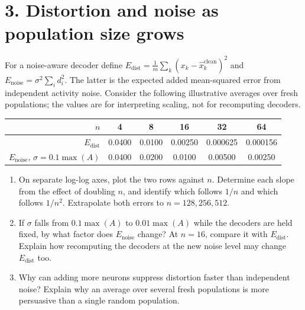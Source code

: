 \documentclass[11pt,letterpaper]{article}
\begin{document}
\section*{3. Distortion and noise as population size grows}
For a noise-aware decoder define \(E_{\mathrm{dist}}=\frac1m\sum_k(x_k-\hat{x}_k^{\mathrm{clean}})^2\) and \(E_{\mathrm{noise}}=\sigma^2\sum_i d_i^2\). The latter is the expected added mean-squared error from independent activity noise. Consider the following illustrative averages over fresh populations; the values are for interpreting scaling, not for recomputing decoders.
\begin{center}\begin{tabular}{rccccc}\toprule
\(n\) & 4 & 8 & 16 & 32 & 64\\\midrule
\(E_{\mathrm{dist}}\) & 0.0400 & 0.0100 & 0.00250 & 0.000625 & 0.000156\\
\(E_{\mathrm{noise}}\), \(\sigma=0.1\max(A)\) & 0.0400 & 0.0200 & 0.0100 & 0.00500 & 0.00250\\\bottomrule
\end{tabular}\end{center}
\begin{enumerate}[label=\textbf{3\alph*.}]
\item On separate log-log axes, plot the two rows against \(n\). Determine each slope from the effect of doubling \(n\), and identify which follows \(1/n\) and which follows \(1/n^2\). Extrapolate both errors to \(n=128,256,512\).
\item If \(\sigma\) falls from \(0.1\max(A)\) to \(0.01\max(A)\) while the decoders are held fixed, by what factor does \(E_{\mathrm{noise}}\) change? At \(n=16\), compare it with \(E_{\mathrm{dist}}\). Explain how recomputing the decoders at the new noise level may change \(E_{\mathrm{dist}}\) too.
\item Why can adding more neurons suppress distortion faster than independent noise? Explain why an average over several fresh populations is more persuasive than a single random population.
\end{enumerate}
\end{document}
